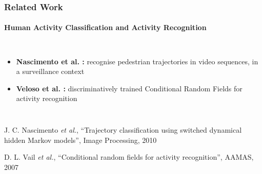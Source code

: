 \begin{frame}
	\frametitle{Related Work}
	\framesubtitle{Human Activity Classification and Activity Recognition}
	
	\vspace{0.4cm}
	
	\begin{columns}[T]
		
		\vspace{0.2cm}
		
		\begin{itemize}
			\item \textbf{Nascimento {et al.} \cite{Nascimento10}:} recognise pedestrian trajectories in
				  video sequences, in a surveillance context
			
			\vspace{1.2cm}
			
			\item \textbf{Veloso {et al.} \cite{Vail07}:} discriminatively trained Conditional Random
				  Fields for activity recognition
		\end{itemize}
		
		
		\centering
	\end{columns}
	
	\vspace{0.47cm}
	
	\tiny
	
	\cite{Nascimento10} J. C. Nascimento \emph{et al.}, ``Trajectory classification using switched
	dynamical hidden Markov models'', Image Processing, 2010
	
	\vspace{-0.17cm}
	
	\cite{Vail07} D. L. Vail \emph{et al.}, ``Conditional random fields for activity recognition'',
	AAMAS, 2007
\end{frame}

